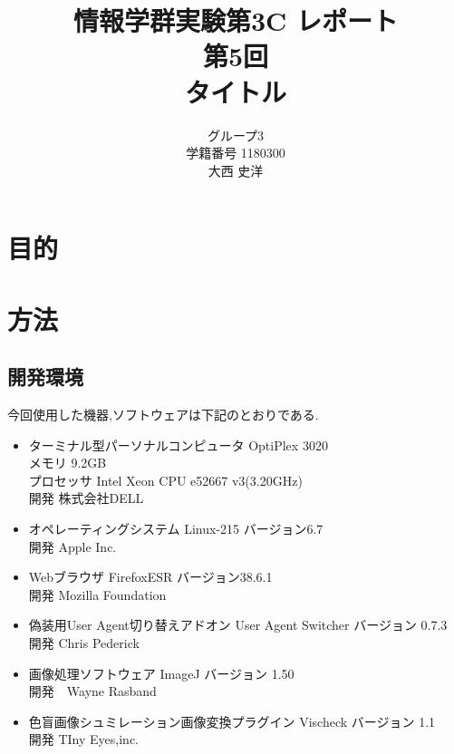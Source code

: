 \documentclass[a4j]{jarticle}
\title{
\vspace{30mm}
{\bf 情報学群実験第3C レポート}
\\
\vspace{5mm}
第5回\\
\vspace{5mm}
       {\bf タイトル}
\vspace{90mm}
}
\author{
\vspace{5mm}
グループ3 \\
\vspace{5mm}
学籍番号 1180300 \\
\vspace{5mm}
{\large 大西 史洋}
\vspace{10mm}
}
\begin{document}
\maketitle

\newpage
\begin{abstract} %

\end{abstract}

\section{目的}

\section{方法}
\subsection{開発環境}
今回使用した機器,ソフトウェアは下記のとおりである.

\begin{itemize}
  \item ターミナル型パーソナルコンピュータ OptiPlex 3020\\
  メモリ 9.2GB\\
  プロセッサ Intel Xeon CPU e52667 v3(3.20GHz)\\
  開発 株式会社DELL

  \item オペレーティングシステム Linux-215 バージョン6.7\\
  開発 Apple Inc.

  \item Webブラウザ FirefoxESR バージョン38.6.1\\
  開発 Mozilla Foundation

  \item 偽装用User Agent切り替えアドオン User Agent Switcher バージョン 0.7.3\\
  開発 Chris Pederick

  \item 画像処理ソフトウェア ImageJ バージョン 1.50\\
  開発　Wayne Rasband

  \item 色盲画像シュミレーション画像変換プラグイン Vischeck バージョン 1.1\\
  開発 TIny Eyes,inc.

\end{itemize}
\end{document}
